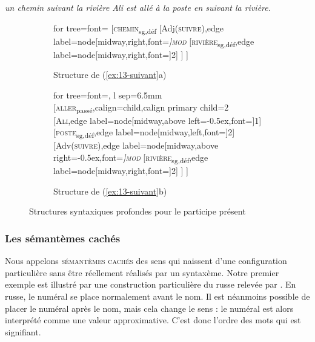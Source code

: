 \ea\label{ex:13-suivant}  
\ea \textit{un chemin suivant la rivière}
\ex \textit{Ali est allé à la poste en suivant la rivière.}\z\z

\begin{figure}
	\begin{subfigure}[b]{0.5\textwidth}
		\centering
		\begin{forest} for tree={font=\normalfont}
			[\textsc{chemin}\textsubscript{sg,déf}
			[Adj(\textsc{suivre}),edge label={node[midway,right,font=\footnotesize\itshape]{\textsc{mod}}}
			[\textsc{rivière}\textsubscript{sg,déf},edge label={node[midway,right,font=\footnotesize]{2}}]
			]
			]
		\end{forest}
		\caption{Structure de (\ref{ex:13-suivant}a)}
	\end{subfigure}%
	\hfill
	\begin{subfigure}[b]{0.5\textwidth}
		\centering
		\begin{forest} for tree={font=\normalfont, l sep=6.5mm}
			[\textsc{aller}\textsubscript{passé},calign=child,calign primary child=2
				[\textsc{Ali},edge label={node[midway,above left=-0.5ex,font=\footnotesize]{1}}]
				[\textsc{poste}\textsubscript{sg,déf},edge label={node[midway,left,font=\footnotesize]{2}}]
				[Adv(\textsc{suivre}),edge label={node[midway,above right=-0.5ex,font=\footnotesize\itshape]{\textsc{mod}}}
					[\textsc{rivière}\textsubscript{sg,déf},edge label={node[midway,right,font=\footnotesize]{2}}]
				]
			]
		\end{forest}
		\caption{Structure de (\ref{ex:13-suivant}b)}
	\end{subfigure}
\caption{Structures syntaxiques profondes pour le participe présent\label{fig:13-suivant}}
\end{figure}

\subsubsection{Les sémantèmes cachés}\label{sec:13-cache}
\begin{sloppypar}
Nous appelons \textsc{sémantèmes cachés} des sens qui naissent d’une configuration particulière sans être réellement réalisés par un syntaxème. Notre premier exemple est illustré par une construction particulière du russe relevée par \citet[141]{melcuk1988dependency}. En russe, le numéral se place normalement avant le nom. Il est néanmoins possible de placer le numéral après le nom, mais cela change le sens : le numéral est alors interprété comme une valeur approximative. C’est donc l’ordre des mots qui est signifiant. 
\end{sloppypar}

